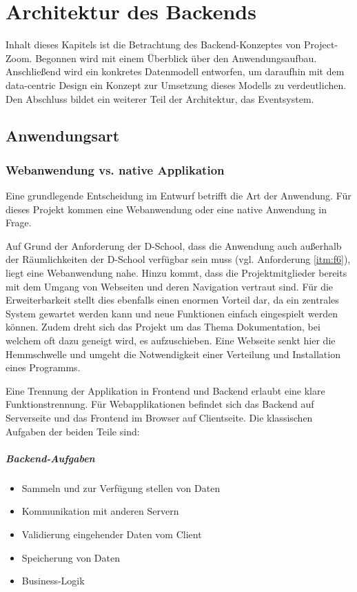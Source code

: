 \chapter{Architektur des Backends}

Inhalt dieses Kapitels ist die Betrachtung des \gls{Backend}-Konzeptes von Project-Zoom. Begonnen wird mit einem Überblick über den Anwendungsaufbau. Anschließend wird ein konkretes Datenmodell entworfen, um daraufhin mit dem data-centric Design ein Konzept zur Umsetzung dieses Modells zu verdeutlichen.  Den Abschluss bildet ein weiterer Teil der Architektur, das \gls{Eventsystem}.

\section{Anwendungsart}
\subsection{Webanwendung vs. native Applikation}
Eine grundlegende Entscheidung im Entwurf betrifft die Art der Anwendung. Für dieses Projekt kommen eine Webanwendung oder eine native Anwendung in Frage. 

Auf Grund der Anforderung der D-School, dass die Anwendung auch außerhalb der Räumlichkeiten der D-School verfügbar sein muss (vgl. Anforderung \ref{itm:f6}), liegt eine Webanwendung nahe. Hinzu kommt, dass die Projektmitglieder bereits mit dem Umgang von Webseiten und deren Navigation vertraut sind. Für die Erweiterbarkeit stellt dies ebenfalls einen enormen Vorteil dar, da ein zentrales System gewartet werden kann und neue Funktionen einfach eingespielt werden können. Zudem dreht sich das Projekt um das Thema Dokumentation, bei welchem oft dazu geneigt wird, es aufzuschieben. Eine Webseite senkt hier die Hemmschwelle und umgeht die Notwendigkeit einer Verteilung und Installation eines Programms.

Eine Trennung der Applikation in \gls{Frontend} und \gls{Backend} erlaubt eine klare Funktionstrennung. Für Webapplikationen befindet sich das \gls{Backend} auf Serverseite und das \gls{Frontend} im Browser auf Clientseite. Die klassischen Aufgaben der beiden Teile sind:  
\paragraph{\gls{Backend}-Aufgaben}
\begin{itemize}
  \item Sammeln und zur Verfügung stellen von Daten
  \item Kommunikation mit anderen Servern
  \item Validierung eingehender Daten vom Client
  \item Speicherung von Daten
  \item \gls{Business-Logik}
\end{itemize}

